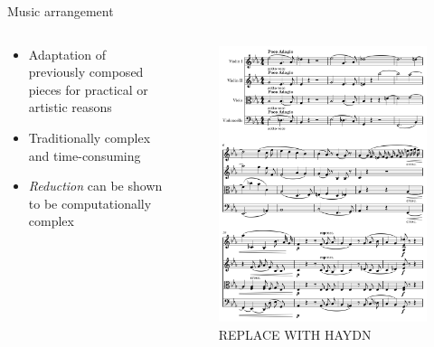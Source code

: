\documentclass[handout]{beamer}
\begin{document}
\begin{frame}{Music arrangement}
    \begin{columns}
        \begin{column}{0.6\textwidth}
            \begin{itemize}[<+(1)->]
                \item Adaptation of previously composed pieces for practical or artistic reasons
                \item Traditionally complex and time-consuming
                \item \emph{Reduction} can be shown to be computationally complex\footnotemark
            \end{itemize}
        \end{column}
        \begin{column}{0.4\textwidth}
            \begin{figure}
                \centering
                    \includegraphics[width=\textwidth]{excerpt-1.png}
                    \caption{REPLACE WITH HAYDN}
                \end{figure}
        \end{column}
    \end{columns}


\end{frame}
\end{document}
